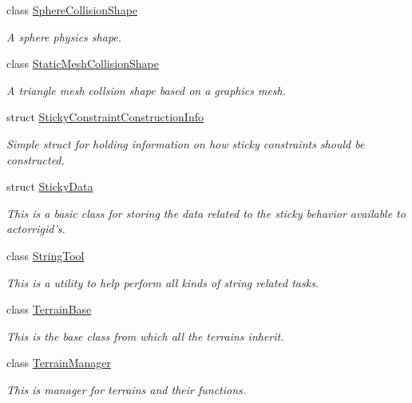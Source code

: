\begin{DoxyCompactItemize}
class \hyperlink{classMezzanine_1_1SphereCollisionShape}{SphereCollisionShape}
\begin{DoxyCompactList}\small\item\em A sphere physics shape. \item\end{DoxyCompactList}\item 
class \hyperlink{classMezzanine_1_1StaticMeshCollisionShape}{StaticMeshCollisionShape}
\begin{DoxyCompactList}\small\item\em A triangle mesh collsion shape based on a graphics mesh. \item\end{DoxyCompactList}\item 
struct \hyperlink{structMezzanine_1_1StickyConstraintConstructionInfo}{StickyConstraintConstructionInfo}
\begin{DoxyCompactList}\small\item\em Simple struct for holding information on how sticky constraints should be constructed. \item\end{DoxyCompactList}\item 
struct \hyperlink{structMezzanine_1_1StickyData}{StickyData}
\begin{DoxyCompactList}\small\item\em This is a basic class for storing the data related to the sticky behavior available to actorrigid's. \item\end{DoxyCompactList}\item 
class \hyperlink{classMezzanine_1_1StringTool}{StringTool}
\begin{DoxyCompactList}\small\item\em This is a utility to help perform all kinds of string related tasks. \item\end{DoxyCompactList}\item 
class \hyperlink{classMezzanine_1_1TerrainBase}{TerrainBase}
\begin{DoxyCompactList}\small\item\em This is the base class from which all the terrains inherit. \item\end{DoxyCompactList}\item 
class \hyperlink{classMezzanine_1_1TerrainManager}{TerrainManager}
\begin{DoxyCompactList}\small\item\em This is manager for terrains and their functions. \item\end{DoxyCompactList}\item 

\end{DoxyCompactItemize}
